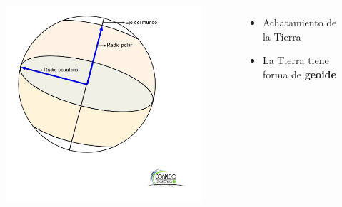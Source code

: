 \documentclass{beamer}
\begin{document}
\begin{frame}
 \begin{columns}
  \begin{figure}
   \centering
   \includegraphics[scale=0.4]{Imagenes/Achatamiento_01}
  \end{figure}
 \small
 \justify
\begin{itemize}
\item Achatamiento de la Tierra
\item La Tierra tiene forma de \textbf{geoide}
\end{itemize}
 \end{columns}
\end{frame}
\end{document}
